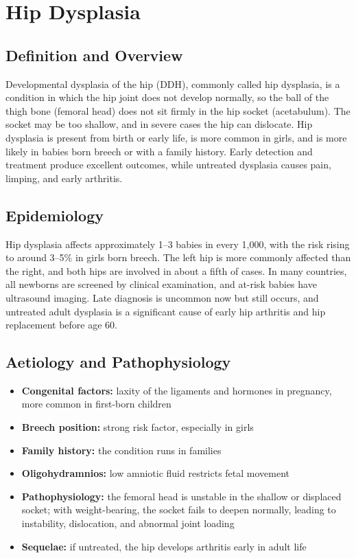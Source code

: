 \chapter{Hip Dysplasia}

\section*{Definition and Overview}
Developmental dysplasia of the hip (DDH), commonly called hip dysplasia, is a condition in which the hip joint does not develop normally, so the ball of the thigh bone (femoral head) does not sit firmly in the hip socket (acetabulum). The socket may be too shallow, and in severe cases the hip can dislocate. Hip dysplasia is present from birth or early life, is more common in girls, and is more likely in babies born breech or with a family history. Early detection and treatment produce excellent outcomes, while untreated dysplasia causes pain, limping, and early arthritis.

\section*{Epidemiology}
Hip dysplasia affects approximately 1--3 babies in every 1,000, with the risk rising to around 3--5\% in girls born breech. The left hip is more commonly affected than the right, and both hips are involved in about a fifth of cases. In many countries, all newborns are screened by clinical examination, and at-risk babies have ultrasound imaging. Late diagnosis is uncommon now but still occurs, and untreated adult dysplasia is a significant cause of early hip arthritis and hip replacement before age 60.

\section*{Aetiology and Pathophysiology}
\begin{itemize}
    \item \textbf{Congenital factors:} laxity of the ligaments and hormones in pregnancy, more common in first-born children
    \item \textbf{Breech position:} strong risk factor, especially in girls
    \item \textbf{Family history:} the condition runs in families
    \item \textbf{Oligohydramnios:} low amniotic fluid restricts fetal movement
    \item \textbf{Pathophysiology:} the femoral head is unstable in the shallow or displaced socket; with weight-bearing, the socket fails to deepen normally, leading to instability, dislocation, and abnormal joint loading
    \item \textbf{Sequelae:} if untreated, the hip develops arthritis early in adult life
\end{itemize}

